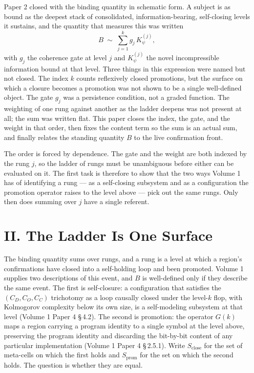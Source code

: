 \documentclass[11pt,oneside]{report}
\theoremstyle{definition}
\theoremstyle{remark}
\begin{document}
Paper 2 closed with the binding quantity in schematic form. A subject is as
bound as the deepest stack of consolidated, information-bearing,
self-closing levels it sustains, and the quantity that measures this was
written
\[
B \;\sim\; \sum_{j=1}^{k} g_{j}\,K_{\psi}^{(j)},
\]
with \ensuremath{g_{j}} the coherence gate at level \ensuremath{j} and
\ensuremath{K_{\psi}^{(j)}} the novel incompressible information bound at that
level. Three things in this expression were named but not closed. The index
\ensuremath{k} counts reflexively closed promotions, but the surface on which
a closure becomes a promotion was not shown to be a single well-defined
object. The gate \ensuremath{g_{j}} was a persistence condition, not a graded
function. The weighting of one rung against another as the ladder deepens was
not present at all; the sum was written flat. This paper closes the index,
the gate, and the weight in that order, then fixes the content term so the
sum is an actual sum, and finally relates the standing quantity \ensuremath{B}
to the live confirmation front.

The order is forced by dependence. The gate and the weight are both indexed
by the rung \ensuremath{j}, so the ladder of rungs must be unambiguous before
either can be evaluated on it. The first task is therefore to show that the
two ways Volume 1 has of identifying a rung --- as a self-closing subsystem
and as a configuration the promotion operator raises to the level above ---
pick out the same rungs. Only then does summing over \ensuremath{j} have a
single referent.

\section*{II. The Ladder Is One Surface}

The binding quantity sums over rungs, and a rung is a level at which a
region's confirmations have closed into a self-holding loop and been
promoted. Volume 1 supplies two descriptions of this event, and
\ensuremath{B} is well-defined only if they describe the same event. The
first is self-closure: a configuration that satisfies the
\ensuremath{(C_{D}, C_{O}, C_{C})} trichotomy as a loop causally closed under
the level-\ensuremath{k} flop, with Kolmogorov complexity below its own size,
is a self-modeling subsystem at that level (Volume 1 Paper 4 \S\,4.2). The
second is promotion: the operator \ensuremath{G(k)} maps a region carrying a
program identity to a single symbol at the level above, preserving the
program identity and discarding the bit-by-bit content of any particular
implementation (Volume 1 Paper 4 \S\,2.5.1). Write \ensuremath{S_{\mathrm{close}}}
for the set of meta-cells on which the first holds and \ensuremath{S_{\mathrm{prom}}}
for the set on which the second holds. The question is whether they are equal.
\end{document}
